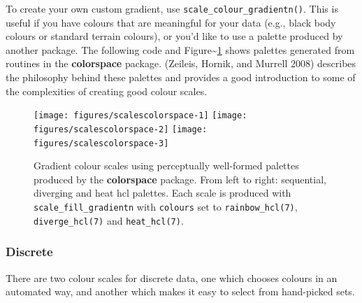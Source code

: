 To create your own custom gradient, use
\texttt{scale\_colour\_gradientn()}. This is useful if you have colours
that are meaningful for your data (e.g., black body colours or standard
terrain colours), or you'd like to use a palette produced by another
package. The following code and
Figure\textasciitilde{}\ref{fig:colorspace} shows palettes generated
from routines in the \textbf{colorspace} package. (Zeileis, Hornik, and
Murrell 2008) describes the philosophy behind these palettes and
provides a good introduction to some of the complexities of creating
good colour scales. 
 

\begin{Shaded}
\begin{Highlighting}[]
\NormalTok{(}\NormalTok{)}
\StringTok{ }
  \NormalTok{(} \NormalTok{(}\NormalTok{), } \NormalTok{(}\NormalTok{, }\NormalTok{))}
\NormalTok{\}}
\StringTok{ }
\StringTok{ }
\StringTok{ }
\end{Highlighting}
\end{Shaded}

\begin{figure}
\texttt{[image: figures/scalescolorspace-1]} \texttt{[image: figures/scalescolorspace-2]} \texttt{[image: figures/scalescolorspace-3]} \caption{Gradient colour scales using perceptually well-formed palettes produced by the \textbf{colorspace} package.  From left to right: sequential, diverging and heat hcl palettes.  Each scale is produced with \texttt{scale\_fill\_gradientn} with \texttt{colours} set to \texttt{rainbow\_hcl(7)}, \texttt{diverge\_hcl(7)} and \texttt{heat\_hcl(7)}.\label{fig:colorspace}}
\end{figure}

\subsubsection{Discrete}\label{ssub:colour-discrete}

There are two colour scales for discrete data, one which chooses colours
in an automated way, and another which makes it easy to select from
hand-picked sets.

